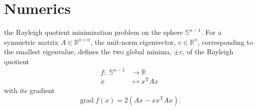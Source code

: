 \chapter{Numerics}

the Rayleigh quotient minimization problem on the sphere $\mathbb{S}^{n-1}$. For a symmetric matrix $A \in \mathbb{R}^{n \times n}$, the unit-norm eigenvector, $v \in \mathbb{R}^n$, corresponding to the smallest eigenvalue, defines the two global minima, $\pm v$, of the Rayleigh quotient  
\begin{equation}\label{RayleighQuotient}
    \begin{split}
        f \colon \; \mathbb{S}^{n-1} & \to \mathbb{R} \\
        x & \mapsto x^{\mathrm{T}} A x 
    \end{split}
\end{equation}   
with its gradient 
\begin{equation*}
    \operatorname{grad} f(x) = 2(Ax - x x^{\mathrm{T}} A x).
\end{equation*}